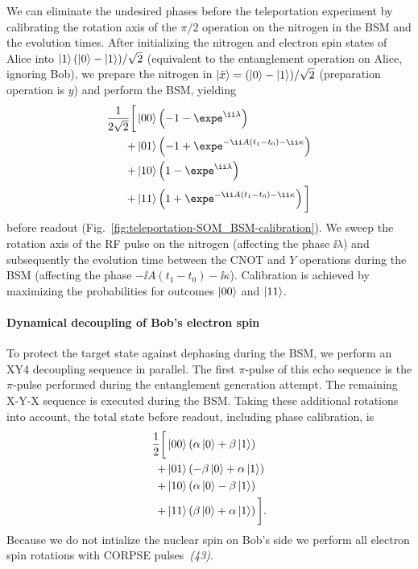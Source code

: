 We can eliminate the undesired phases before the teleportation experiment by calibrating the rotation axis of the $\pi/2$ operation on the nitrogen in the BSM and the evolution times. After initializing the nitrogen and electron spin states of Alice into $\left|1\right>(\left|0\right> - \left|1\right>)/\sqrt{2}$ (equivalent to the entanglement operation on Alice, ignoring Bob), we prepare the nitrogen in $\left|\bar x\right> = (\left|0\right> - \left|1\right>)/\sqrt{2}$ (preparation operation is $y$) and perform the BSM, yielding
\begin{align}
    \frac{1}{2\sqrt2} \bigg[
          & \ket{00} \left( -1 - \expe^{\ii\lambda} \right) \notag\\
        + & \ket{01} \left( -1 + 
            \expe^{-\ii A(t_1-t_0) -\ii\kappa} \right) \notag\\
        + & \ket{10} \left( 1 - \expe^{\ii\lambda} \right) \notag\\
        + & \ket{11} \left( 1 + \expe^{-\ii A(t_1-t_0) -\ii\kappa} \right)
    \bigg]
\end{align}
before readout (Fig.~\ref{fig:teleportation-SOM_BSM-calibration}). We sweep the rotation axis of the RF pulse on the nitrogen (affecting the phase $\ii\lambda$) and subsequently the evolution time between the CNOT and $Y$ operations during the BSM (affecting the phase $-\ii A(t_1-t_0) -\ii\kappa$). Calibration is achieved by maximizing the probabilities for outcomes $\left|00\right>$ and $\left|11\right>$. 

\paragraph{Dynamical decoupling of Bob's electron spin}

To protect the target state against dephasing during the BSM, we perform an XY4 decoupling sequence in parallel. The first $\pi$-pulse of this echo sequence is the $\pi$-pulse performed during the entanglement generation attempt. The remaining X-Y-X sequence is executed during the BSM. Taking these additional rotations into account, the total state before readout, including phase calibration, is
\begin{align}
    \label{eq:BSM-outcomes}
    \frac{1}{2} \bigg[
          & \left|00\right> \left( \alpha\left|0\right> + \beta\left|1\right> \right) \notag\\
        + & \left|01\right> \left( -\beta\left|0\right> + \alpha\left|1\right> \right) \notag\\
        + & \left|10\right> \left( \alpha\left|0\right> - \beta\left|1\right> \right) \notag\\
        + & \left|11\right> \left( \beta\left|0\right> + \alpha\left|1\right> \right)
    \bigg].
\end{align}
Because we do not intialize the nuclear spin on Bob's side we perform all electron spin rotations with CORPSE pulses~{\em (43)}. %

